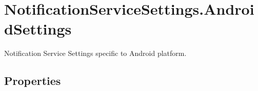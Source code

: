\hypertarget{class_voxel_busters_1_1_native_plugins_1_1_notification_service_settings_1_1_android_settings}{}\section{Notification\+Service\+Settings.\+Android\+Settings}
\label{class_voxel_busters_1_1_native_plugins_1_1_notification_service_settings_1_1_android_settings}


Notification Service Settings specific to Android platform.  


\subsection*{Properties}
